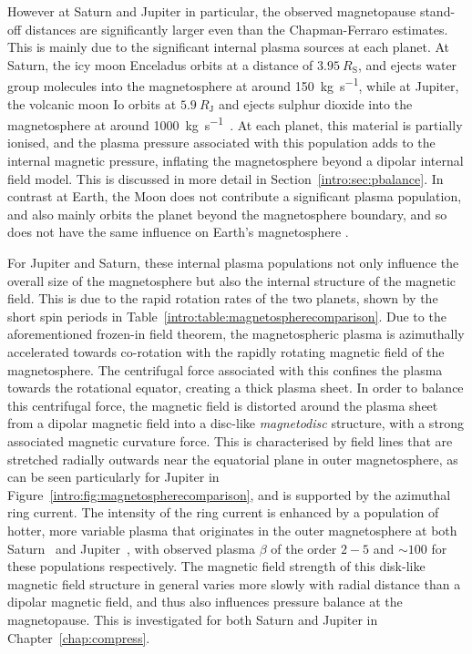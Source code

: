 However at Saturn and Jupiter in particular, the observed magnetopause stand-off distances are significantly larger even than the Chapman-Ferraro estimates. This is mainly due to the significant internal plasma sources at each planet. At Saturn, the icy moon Enceladus orbits at a distance of $\SI{3.95}{R_\mathrm{S}}$, and ejects water group molecules into the magnetosphere at around \SI{150}{kg s^{-1}}, while at Jupiter, the volcanic moon Io orbits at $\SI{5.9}{R_\mathrm{J}}$ and ejects sulphur dioxide into the magnetosphere at around \SI{1000}{kg s^{-1}}~\citep{bagenal2011}. At each planet, this material is partially ionised, and the plasma pressure associated with this population adds to the internal magnetic pressure, inflating the magnetosphere beyond a dipolar internal field model. This is discussed in more detail in Section~\ref{intro:sec:pbalance}. In contrast at Earth, the Moon does not contribute a significant plasma population, and also mainly orbits the planet beyond the magnetosphere boundary, and so does not have the same influence on Earth's magnetosphere  \citep[e.g.][]{schneider1967}.

For Jupiter and Saturn, these internal plasma populations not only influence the overall size of the magnetosphere but also the internal structure of the magnetic field. This is due to the rapid rotation rates of the two planets, shown by the short spin periods in Table~\ref{intro:table:magnetospherecomparison}. Due to the aforementioned frozen-in field theorem, the magnetospheric plasma is azimuthally accelerated towards co-rotation with the rapidly rotating magnetic field of the magnetosphere. The centrifugal force associated with this confines the plasma towards the rotational equator, creating a thick plasma sheet. In order to balance this centrifugal force, the magnetic field is distorted around the plasma sheet from a dipolar magnetic field into a disc-like \textit{magnetodisc} structure, with a strong associated magnetic curvature force. This is characterised by field lines that are stretched radially outwards near the equatorial plane in outer magnetosphere, as can be seen particularly for Jupiter in Figure~\ref{intro:fig:magnetospherecomparison}, and is supported by the azimuthal ring current. The intensity of the ring current is enhanced by a population of hotter, more variable plasma that originates in the outer magnetosphere at both Saturn~\citep[e.g.][]{sergis2010} and Jupiter~\citep[e.g.][]{mauk2004}, with observed plasma $\beta$ of the order $2-5$ and ${\sim}100$ for these populations respectively. The magnetic field strength of this disk-like magnetic field structure in general varies more slowly with radial distance than a dipolar magnetic field, and thus also influences pressure balance at the magnetopause. This is investigated for both Saturn and Jupiter in Chapter~\ref{chap:compress}. 

